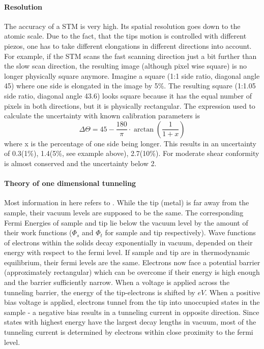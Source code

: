\paragraph{Resolution} The accuracy of a STM is very high. Its spatial resolution goes down to the atomic scale. Due to the fact, that the tips motion is controlled with different piezos, one has to take different elongations in different directions into account. For example, if the STM scans the fast scanning direction just a bit further than the slow scan direction, the resulting image (although pixel wise square) is no longer physically square anymore. Imagine a square (1:1 side ratio, diagonal angle 45\textdegree) where one side is elongated in the image by 5\%. The resulting square (1:1.05 side ratio, diagonal angle 43.6\textdegree) looks square because it has the equal number of pixels in both directions, but it is physically rectangular. The expression used to calculate the uncertainty with known calibration parameters is
$$\Delta \Theta = 45 - \frac{180}{\pi}\cdot\arctan(\frac{1}{1+x})$$ where x is the percentage of one side being longer. This results in an uncertainty of 0.3\textdegree(1\%), 1.4\textdegree(5\%, see example above), 2.7\textdegree(10\%). For moderate shear conformity is almost conserved and the uncertainty below 2\textdegree.

\paragraph{Theory of one dimensional tunneling}
Most information in here refers to \cite{bonnell_scanning_1993}.
While the tip (metal) is far away from the sample, their vacuum levels are supposed to be the same. The corresponding Fermi Energies of sample and tip lie below the vacuum level by the amount of their work functions ($\Phi_s$ and $\Phi_t$ for sample and tip respectively). Wave functions of electrons within the solids decay exponentially in vacuum, depended on their energy with respect to the fermi level.
If sample and tip are in thermodynamic equilibrium, their fermi levels are the same. Electrons now face a potential barrier (approximately rectangular) which can be overcome if their energy is high enough and the barrier sufficiently narrow. When a voltage is applied across the tunneling barrier, the energy of the tip-electrons is shifted by $eV$. When a positive bias voltage is applied, electrons tunnel from the tip into unoccupied states in the sample - a negative bias results in a tunneling current in opposite direction. Since states with highest energy have the largest decay lengths in vacuum, most of the tunneling current is determined by electrons within close proximity to the fermi level.


